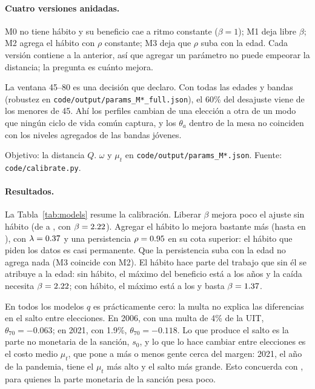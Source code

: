 \documentclass[11pt]{article}
\theoremstyle{definition}
\newcommand{\1}{\mathbbm{1}}
\begin{document}
\paragraph{Cuatro versiones anidadas.} M0 no tiene hábito y su beneficio cae a ritmo constante
($\beta=1$); M1 deja libre $\beta$; M2 agrega el hábito con $\rho$ constante; M3 deja que $\rho$ suba
con la edad. Cada versión contiene a la anterior, así que agregar un parámetro no puede empeorar la
distancia; la pregunta es cuánto mejora.

La ventana 45--80 es una decisión que declaro. Con todas las edades y bandas (robustez en
\texttt{code/output/params\_M*\_full.json}), el 60\% del desajuste viene de los menores de 45. Ahí
los perfiles cambian de una elección a otra de un modo que ningún ciclo de vida común captura, y
los $\theta_a$ dentro de la mesa no coinciden con los niveles agregados de las bandas jóvenes.

\begin{table}[ht]
  \centering\small
  \caption{Calibración de los modelos anidados (ventana 45--80).}\label{tab:models}
  \par\smallskip\footnotesize Objetivo: la distancia $Q$. $\omega$ y $\mu_t$ en
  \texttt{code/output/params\_M*.json}. Fuente: \texttt{code/calibrate.py}.
\end{table}

\paragraph{Resultados.} La Tabla~\ref{tab:models} resume la calibración. Liberar $\beta$ mejora poco
el ajuste sin hábito (de \objMzero{} a \objMone{}, con $\beta=2.22$). Agregar el hábito lo
mejora bastante más (hasta \objBest{} en \bestModel{}), con $\lambda=0.37$ y una persistencia
$\rho=0.95$ en su cota superior: el hábito que piden los datos es casi permanente. Que la
persistencia suba con la edad no agrega nada (M3 coincide con M2). El hábito hace parte del trabajo
que sin él se atribuye a la edad: sin hábito, el máximo del beneficio está a los \peakStatic{} años y
la caída necesita $\beta=2.22$; con hábito, el máximo está a los \peakBest{} y basta
$\beta=1.37$.

En todos los modelos $q$ es prácticamente cero: la multa no explica las diferencias en el salto
entre elecciones. En 2006, con una multa de 4\% de la UIT, $\theta_{70}=-0.063$; en 2021, con 1.9\%,
$\theta_{70}=-0.118$. Lo que produce el salto es la parte no monetaria de la sanción, $s_0$, y lo que
lo hace cambiar entre elecciones es el costo medio $\mu_t$, que pone a más o menos gente cerca del
margen: 2021, el año de la pandemia, tiene el $\mu_t$ más alto y el salto más grande. Esto concuerda
con \citet{gonzales2022}, para quienes la parte monetaria de la sanción pesa poco.
\end{document}
